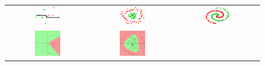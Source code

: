 \documentclass[12pt]{article}
\begin{document}
\begin{figure}[H]
	\begin{tabular}{ccc}
		\includegraphics[width=0.33\textwidth]{simple_data_tree} &
		\includegraphics[width=0.33\textwidth]{circle_data_tree} &
		\includegraphics[width=0.33\textwidth]{spiral_data_tree} \\
		\includegraphics[width=0.33\textwidth]{simple_data_dl} &
		\includegraphics[width=0.33\textwidth]{circle_data_dl} &

\end{tabular}
\end{figure}
\end{document}
